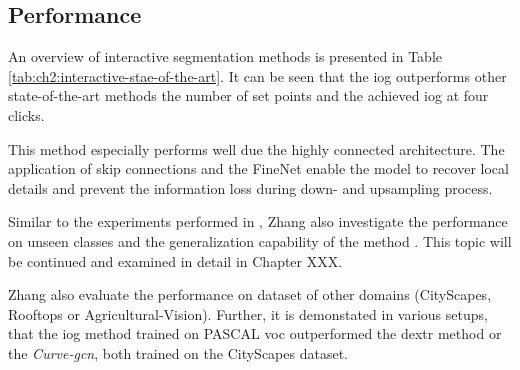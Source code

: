 \subsection{Performance}\label{ord:ch3:sec4:subsec5}

An overview of interactive segmentation methods is presented in Table \ref{tab:ch2:interactive-stae-of-the-art}.
It can be seen that the \gls{iog} outperforms other state-of-the-art methods the number of set points and the achieved \gls{iog} at four clicks.

This method especially performs well due the highly connected architecture.
The application of skip connections and the FineNet enable the model to recover local details and prevent the information loss during down- and upsampling process.

Similar to the experiments performed in \cite{Man18-DEXTR}, Zhang \etal also investigate the performance on unseen classes and the generalization capability of the method \Cite{Zha20-IOG}. 
This topic will be continued and examined in detail in Chapter XXX.

Zhang \etal also evaluate the performance on dataset of other domains (\eg CityScapes, Rooftops or Agricultural-Vision).
Further, it is demonstated in various setups, that the \gls{iog} method trained on PASCAL \gls{voc} outperformed the \gls{dextr} method or the \textit{Curve-\gls{gcn}}, both trained on the CityScapes dataset.

